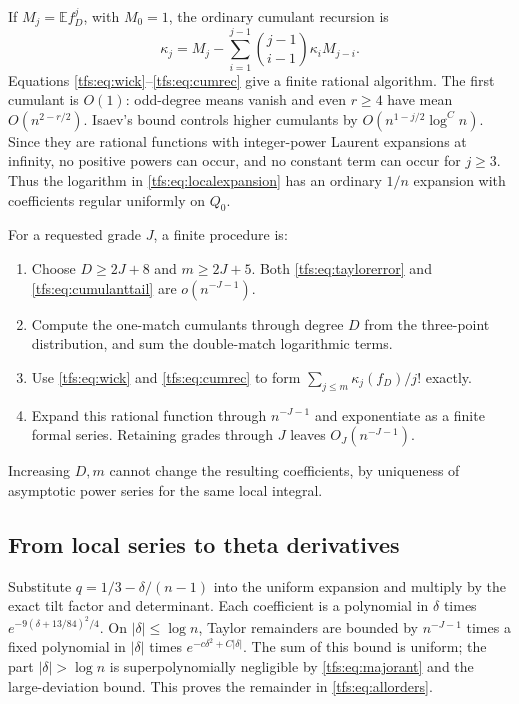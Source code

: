 \documentclass[11pt,a4paper]{article}
\numberwithin{equation}{section}
\theoremstyle{remark}
\newcommand{\E}{\mathbb E}
\newcommand{\1}{\mathbf 1}
\begin{document}
If $M_j=\E f_D^j$, with $M_0=1$, the ordinary cumulant recursion is
\begin{equation}\label{tfs:eq:cumrec}
\kappa_j=M_j-\sum_{i=1}^{j-1}\binom{j-1}{i-1}\kappa_i M_{j-i}.
\end{equation}
Equations \eqref{tfs:eq:wick}--\eqref{tfs:eq:cumrec} give a finite rational
algorithm. The first cumulant is $O(1)$: odd-degree means vanish and
even $r\geq4$ have mean $O(n^{2-r/2})$. Isaev's bound controls higher
cumulants by $O(n^{1-j/2}\log^C n)$. Since they are rational functions
with integer-power Laurent expansions at infinity, no positive powers
can occur, and no constant term can occur for $j\geq3$.
Thus the logarithm in \eqref{tfs:eq:localexpansion} has an ordinary $1/n$
expansion with coefficients regular uniformly on $Q_0$.

For a requested grade $J$, a finite procedure is:
\begin{enumerate}
\item Choose $D\geq2J+8$ and $m\geq2J+5$. Both
\eqref{tfs:eq:taylorerror} and \eqref{tfs:eq:cumulanttail} are
$o(n^{-J-1})$.
\item Compute the one-match cumulants through degree $D$ from the
three-point distribution, and sum the double-match logarithmic terms.
\item Use \eqref{tfs:eq:wick} and \eqref{tfs:eq:cumrec} to form
$\sum_{j\leq m}\kappa_j(f_D)/j!$ exactly.
\item Expand this rational function through $n^{-J-1}$ and exponentiate
as a finite formal series. Retaining grades through $J$ leaves
$O_J(n^{-J-1})$.
\end{enumerate}
Increasing $D,m$ cannot change the resulting coefficients, by uniqueness
of asymptotic power series for the same local integral.

\subsection{From local series to theta derivatives}
Substitute $q=1/3-\delta/(n-1)$ into the uniform expansion and multiply
by the exact tilt factor and determinant. Each coefficient is a
polynomial in $\delta$ times
$e^{-9(\delta+13/84)^2/4}$. On $|\delta|\leq\log n$, Taylor remainders
are bounded by $n^{-J-1}$ times a fixed polynomial in $|\delta|$ times
$e^{-c\delta^2+C|\delta|}$. The sum of this bound is uniform; the part
$|\delta|>\log n$ is superpolynomially negligible by
\eqref{tfs:eq:majorant} and the large-deviation bound. This proves the
remainder in \eqref{tfs:eq:allorders}.
\end{document}

